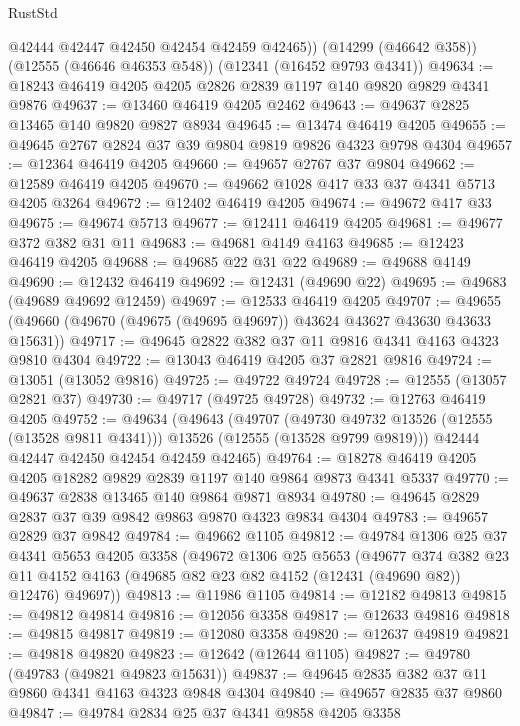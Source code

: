 \begin{lexlean}{RustStd}
\begin{coremodule}
        @42444
        @42447
        @42450
        @42454
        @42459
        @42465))
    (@14299 (@46642 @358))
    (@12555 (@46646 @46353 @548))
    (@12341 (@16452 @9793 @4341))
@49634 := @18243 @46419 @4205 @4205 @2826 @2839 @1197 @140 @9820 @9829 @4341 @9876
@49637 := @13460 @46419 @4205 @2462
@49643 := @49637 @2825 @13465 @140 @9820 @9827 @8934
@49645 := @13474 @46419 @4205
@49655 := @49645 @2767 @2824 @37 @39 @9804 @9819 @9826 @4323 @9798 @4304
@49657 := @12364 @46419 @4205
@49660 := @49657 @2767 @37 @9804
@49662 := @12589 @46419 @4205
@49670 := @49662 @1028 @417 @33 @37 @4341 @5713 @4205 @3264
@49672 := @12402 @46419 @4205
@49674 := @49672 @417 @33
@49675 := @49674 @5713
@49677 := @12411 @46419 @4205
@49681 := @49677 @372 @382 @31 @11
@49683 := @49681 @4149 @4163
@49685 := @12423 @46419 @4205
@49688 := @49685 @22 @31 @22
@49689 := @49688 @4149
@49690 := @12432 @46419
@49692 := @12431 (@49690 @22)
@49695 := @49683 (@49689 @49692 @12459)
@49697 := @12533 @46419 @4205
@49707 := @49655 (@49660 (@49670 (@49675 (@49695 @49697)) @43624 @43627 @43630 @43633 @15631))
@49717 := @49645 @2822 @382 @37 @11 @9816 @4341 @4163 @4323 @9810 @4304
@49722 := @13043 @46419 @4205 @37 @2821 @9816
@49724 := @13051 (@13052 @9816)
@49725 := @49722 @49724
@49728 := @12555 (@13057 @2821 @37)
@49730 := @49717 (@49725 @49728)
@49732 := @12763 @46419 @4205
@49752 := @49634
    (@49643
      (@49707
        (@49730 @49732 @13526 (@12555 (@13528 @9811 @4341)))
        @13526
        (@12555 (@13528 @9799 @9819)))
      @42444
      @42447
      @42450
      @42454
      @42459
      @42465)
@49764 := @18278 @46419 @4205 @4205 @18282 @9829 @2839 @1197 @140 @9864 @9873 @4341 @5337
@49770 := @49637 @2838 @13465 @140 @9864 @9871 @8934
@49780 := @49645 @2829 @2837 @37 @39 @9842 @9863 @9870 @4323 @9834 @4304
@49783 := @49657 @2829 @37 @9842
@49784 := @49662 @1105
@49812 := @49784
    @1306
    @25
    @37
    @4341
    @5653
    @4205
    @3358
    (@49672
      @1306
      @25
      @5653
      (@49677
        @374
        @382
        @23
        @11
        @4152
        @4163
        (@49685 @82 @23 @82 @4152 (@12431 (@49690 @82)) @12476)
        @49697))
@49813 := @11986 @1105
@49814 := @12182 @49813
@49815 := @49812 @49814
@49816 := @12056 @3358
@49817 := @12633 @49816
@49818 := @49815 @49817
@49819 := @12080 @3358
@49820 := @12637 @49819
@49821 := @49818 @49820
@49823 := @12642 (@12644 @1105)
@49827 := @49780 (@49783 (@49821 @49823 @15631))
@49837 := @49645 @2835 @382 @37 @11 @9860 @4341 @4163 @4323 @9848 @4304
@49840 := @49657 @2835 @37 @9860
@49847 := @49784 @2834 @25 @37 @4341 @9858 @4205 @3358

\end{coremodule}
\end{lexlean}
